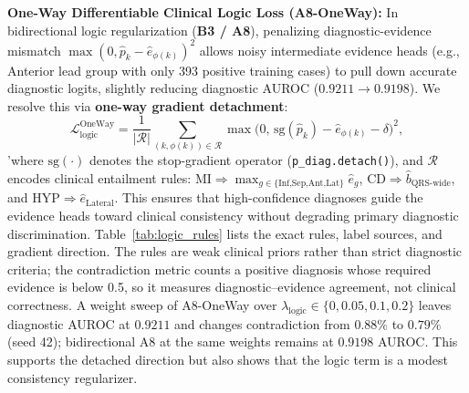 \documentclass[preprint,12pt]{elsarticle}
\begin{document}
\textbf{One-Way Differentiable Clinical Logic Loss (\textbf{A8-OneWay}):} In bidirectional logic regularization (\textbf{B3 / A8}), penalizing diagnostic-evidence mismatch $\max(0, \hat{p}_k - \hat{e}_{\phi(k)})^2$ allows noisy intermediate evidence heads (e.g., Anterior lead group with only 393 positive training cases) to pull down accurate diagnostic logits, slightly reducing diagnostic AUROC ($0.9211 \to 0.9198$). We resolve this via \textbf{one-way gradient detachment}:
\begin{equation}
    \mathcal{L}_{\text{logic}}^{\text{OneWay}} = \frac{1}{|\mathcal{R}|} \sum_{(k, \phi(k)) \in \mathcal{R}} \max\Big(0, \, \text{sg}(\hat{p}_k) - \hat{e}_{\phi(k)} - \delta \Big)^2,
\end{equation}
'where $\text{sg}(\cdot)$ denotes the stop-gradient operator (\texttt{p\_diag.detach()}), and $\mathcal{R}$ encodes clinical entailment rules: $\text{MI} \Rightarrow \max_{g \in \{\text{Inf,Sep,Ant,Lat}\}} \hat{e}_g$, $\text{CD} \Rightarrow \hat{b}_{\text{QRS-wide}}$, and $\text{HYP} \Rightarrow \hat{e}_{\text{Lateral}}$. This ensures that high-confidence diagnoses guide the evidence heads toward clinical consistency without degrading primary diagnostic discrimination. Table~\ref{tab:logic_rules} lists the exact rules, label sources, and gradient direction. The rules are weak clinical priors rather than strict diagnostic criteria; the contradiction metric counts a positive diagnosis whose required evidence is below 0.5, so it measures diagnostic--evidence agreement, not clinical correctness. A weight sweep of A8-OneWay over $\lambda_{\text{logic}} \in \{0,0.05,0.1,0.2\}$ leaves diagnostic AUROC at $0.9211$ and changes contradiction from $0.88\%$ to $0.79\%$ (seed 42); bidirectional A8 at the same weights remains at $0.9198$ AUROC. This supports the detached direction but also shows that the logic term is a modest consistency regularizer.

\begin{table}[htbp]
\centering
\caption{Clinical logic rules used by A8-OneWay. Labels are weak SCP/NeuroKit2-derived priors, not adjudicated clinical ground truth.}
\label{tab:logic_rules}
\end{table}
\end{document}
